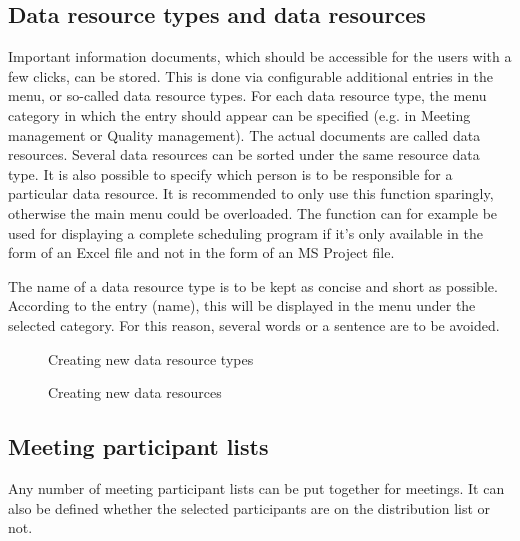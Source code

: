 \subsection{Data resource types and data resources}

Important information documents, which should be accessible for the users with a few clicks, can be stored. This is done via configurable additional entries in the menu, or so-called data resource types. For each data resource type, the menu category in which the entry should appear can be specified (e.g. in Meeting management or Quality management). The actual documents are called data resources. Several data resources can be sorted under the same resource data type. It is also possible to specify which person is to be responsible for a particular data resource. It is recommended to only use this function sparingly, otherwise the main menu could be overloaded. The function can for example be used for displaying a complete scheduling program if it's only available in the form of an Excel file and not in the form of an MS Project file.

\vspace{\baselineskip}

The name of a data resource type is to be kept as concise and short as possible. According to the entry (name), this will be displayed in the menu under the selected category. For this reason, several words or a sentence are to be avoided.

\begin{figure}[H]
\caption{Creating new data resource types}
\end{figure}

\begin{figure}[H]
\caption{Creating new data resources}
\end{figure}


\clearpage
\subsection{Meeting participant lists}

Any number of meeting participant lists can be put together for meetings. It can also be defined whether the selected participants are on the distribution list or not.

